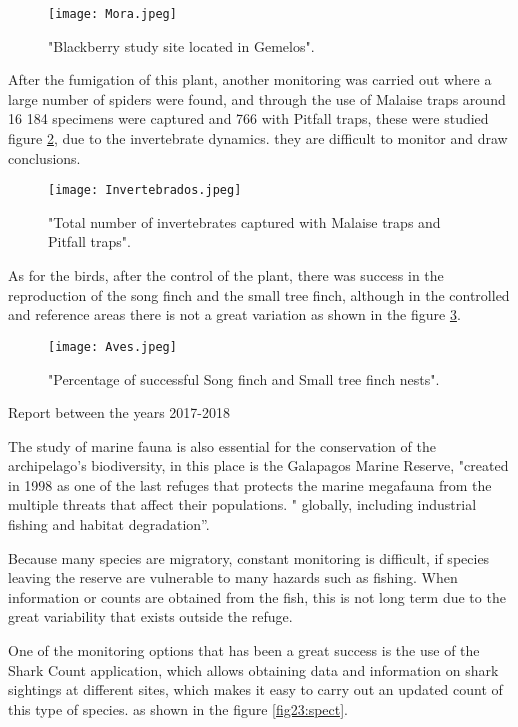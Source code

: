 \documentclass[10pt,english, openany]{book}
\begin{document}
\begin{figure}[h!]
    \centering
    \texttt{[image: Mora.jpeg]}
    \caption{"Blackberry study site located in Gemelos".\cite{2016}}
    \label{fig20:spect}
\end{figure}

\pagebreak

After the fumigation of this plant, another monitoring was carried out where a large number of spiders were found, and through the use of Malaise traps around 16 184 specimens were captured and 766 with Pitfall traps, these were studied figure \ref{fig21:spect}, due to the invertebrate dynamics. they are difficult to monitor and draw conclusions. \cite{2016}

\begin{figure}[h!]
    \centering
    \texttt{[image: Invertebrados.jpeg]}
    \caption{"Total number of invertebrates captured with Malaise traps and Pitfall traps".\cite{2016}}
    \label{fig21:spect}
\end{figure}


As for the birds, after the control of the plant, there was success in the reproduction of the song finch and the small tree finch, although in the controlled and reference areas there is not a great variation as shown in the figure \ref{fig22:spect}.\cite{2016}

\begin{figure}[h!]
    \centering
    \texttt{[image: Aves.jpeg]}
    \caption{"Percentage of successful Song finch and Small tree finch nests".\cite{2016}}
    \label{fig22:spect}
\end{figure}

Report between the years 2017-2018

The study of marine fauna is also essential for the conservation of the archipelago's biodiversity, in this place is the Galapagos Marine Reserve, "created in 1998 as one of the last refuges that protects the marine megafauna from the multiple threats that affect their populations. " globally, including industrial fishing and habitat degradation”.\cite{DDU-UNAM2018}

Because many species are migratory, constant monitoring is difficult, if species leaving the reserve are vulnerable to many hazards such as fishing. When information or counts are obtained from the fish, this is not long term due to the great variability that exists outside the refuge.\cite{DDU-UNAM2018}

One of the monitoring options that has been a great success is the use of the Shark Count application, which allows obtaining data and information on shark sightings at different sites, which makes it easy to carry out an updated count of this type of species. as shown in the figure \ref{fig23:spect}.\cite{DDU-UNAM2018}
\end{document}
